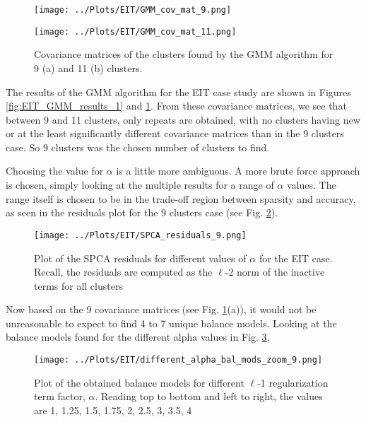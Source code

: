 \documentclass[12pt]{report} %
\begin{document}
\begin{figure}[htbp]
  \centering
  \begin{minipage}{0.7\textwidth}
    \centering
    \texttt{[image: ../Plots/EIT/GMM\_cov\_mat\_9.png]}
    \subcaption{}
  \end{minipage}

  \begin{minipage}{0.9\textwidth}
    \centering
    \texttt{[image: ../Plots/EIT/GMM\_cov\_mat\_11.png]}
    \subcaption{}
  \end{minipage}

  \caption{Covariance matrices of the clusters found by the GMM algorithm for 9 (a) and 11 (b) clusters.}
  \label{fig:EIT_GMM_results_2}

\end{figure}

The results of the GMM algorithm for the EIT case study are shown in Figures \ref{fig:EIT_GMM_results_1} and \ref{fig:EIT_GMM_results_2}. From these covariance matrices, we see that between 9 and 11 clusters, only repeats are obtained, with no clusters having new or at the least significantly different covariance matrices than in the 9 clusters case. So 9 clusters was the chosen number of clusters to find.

Choosing the value for $\alpha$ is a little more ambiguous. A more brute force approach is chosen, simply looking at the multiple results for a range of $\alpha$ values. The range itself is chosen to be in the trade-off region between sparsity and accuracy, as seen in the residuals plot for the 9 clusters case (see Fig. \ref{fig:EIT_spca_residuals}).


\begin{figure}[htbp]
  \centering
  \texttt{[image: ../Plots/EIT/SPCA\_residuals\_9.png]}
  \caption{Plot of the SPCA residuals for different values of $\alpha$ for the EIT case. Recall, the residuals are computed as the $\ell$-2 norm of the inactive terms for all clusters}
  \label{fig:EIT_spca_residuals}
\end{figure}

Now based on the 9 covariance matrices (see Fig. \ref{fig:EIT_GMM_results_2}(a)), it would not be unreasonable to expect to find 4 to 7 unique balance models. Looking at the balance models found for the different alpha values in Fig. \ref{fig:EIT_diff_alpha},

\begin{figure}[htbp]
  \centering
  \texttt{[image: ../Plots/EIT/different\_alpha\_bal\_mods\_zoom\_9.png]}
  \caption{Plot of the obtained balance models for different $\ell$-1 regularization term factor, $\alpha$. Reading top to bottom and left to right, the values are 1, 1.25, 1.5, 1.75, 2, 2.5, 3, 3.5, 4}
  \label{fig:EIT_diff_alpha}
\end{figure}
\end{document}
